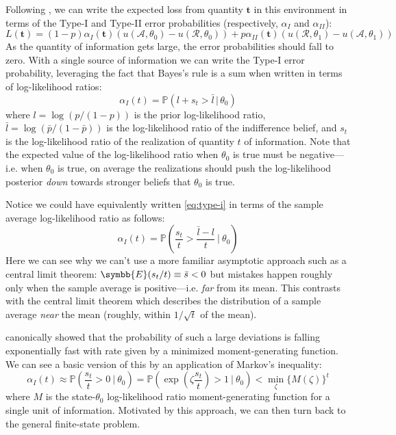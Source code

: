\documentclass{fancyArticle}
\providecommand{\EV}{\symbb{E}}             %
\renewcommand{\|}{\,|\,}                    %
\providecommand{\;}{\,;}                    %
\begin{document}
Following \cite{Moscarini2002}, we can write the expected loss from quantity $\mathbf{t}$ in this environment in terms of the Type-I and Type-II error probabilities (respectively, $\alpha_{I}$ and $\alpha_{II}$):
\begin{equation*}
  \label{eq:2state-loss}
  L(\mathbf{t}) =
  (1-p) \alpha_{I}(\mathbf{t}) (u(\mathcal{A},\theta_0) - u(\mathcal{R},\theta_0))
  +
  p \alpha_{II}(\mathbf{t}) (u(\mathcal{R},\theta_1) - u(\mathcal{A},\theta_1))
\end{equation*}
As the quantity of information gets large, the error probabilities should fall to zero.
With a single source of information we can write the Type-I error probability, leveraging the fact that Bayes's rule is a sum when written in terms of log-likelihood ratios:
\begin{equation}
  \label{eq:type-i}
  \alpha_I(t) = \mathbb{P}\left(
  l + s_t > \bar{l} \| \theta_0\right)
\end{equation}
where $l=\log(p/(1-p))$ is the prior log-likelihood ratio, $\bar{l}=\log(\bar{p}/(1-\bar{p}))$ is the log-likelihood ratio of the indifference belief, and $s_t$ is the log-likelihood ratio of the realization of quantity $t$ of information.
Note that the expected value of the log-likelihood ratio when $\theta_{0}$ is true must be negative---i.e. when $\theta_0$ is true, on average the realizations should push the log-likelihood posterior \textit{down} towards stronger beliefs that $\theta_0$ is true.

Notice we could have equivalently written \ref{eq:type-i} in terms of the sample average log-likelihood ratio as follows:
\begin{equation*}
  \alpha_I(t) = \mathbb{P}\left(
    \frac{s_t}{t} > \frac{\bar{l}-l}{t} \ \bigg|\  \theta_0\right)
\end{equation*}
Here we can see why we can't use a more familiar asymptotic approach such as a central limit theorem: $\EV(s_t/t)\equiv \bar{s}<0$ but mistakes happen roughly only when the sample average is positive---i.e. \textit{far} from its mean.
This contrasts with the central limit theorem which describes the distribution of a sample average \textit{near} the mean (roughly, within $1/\sqrt{t}$ of the mean).

\cite{Cramer1938} canonically showed that the probability of such a large deviations is falling exponentially fast with rate given by a minimized moment-generating function.
We can see a basic version of this by an application of Markov's inequality:
\begin{equation*}
  \label{eq:chernoff-inequality}
  \alpha_I(t)
  \approx
  \mathbb{P}\left(
    \frac{s_t}{t} > 0 \ \bigg|\  \theta_0\right)
  =
 \mathbb{P}\left(
    \exp \left(\zeta \frac{s_t}{t} \right) > 1 \ \bigg|\  \theta_0\right)
  < {\min_{\zeta}\{M(\zeta)\}}^t
\end{equation*}
where $M$ is the state-$\theta_0$ log-likelihood ratio moment-generating function for a single unit of information.
Motivated by this approach, we can then turn back to the general finite-state problem.
\end{document}
